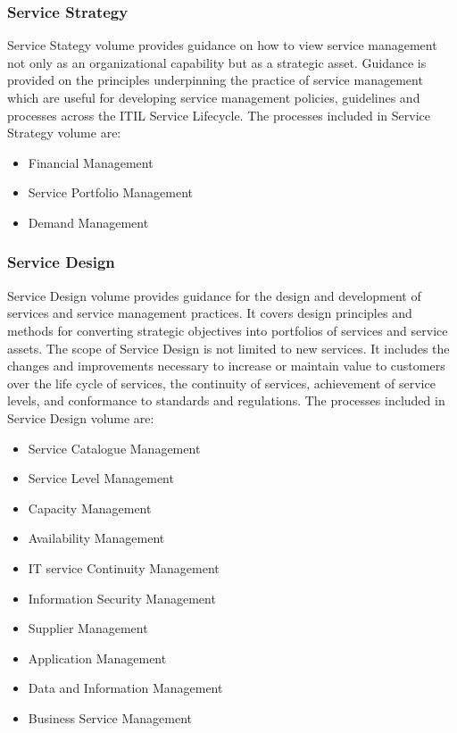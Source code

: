 \subsubsection{Service Strategy} 

Service Stategy volume provides guidance on how to view service management not only as an organizational capability but as a strategic asset. Guidance is provided on the principles underpinning the practice of service management which are useful for developing service management policies, guidelines and processes across the ITIL Service Lifecycle.\cite{itilSS} The processes included in Service Strategy volume are:

\begin{itemize}
  \item Financial Management
  \item Service Portfolio Management 
  \item Demand Management
\end{itemize}

\subsubsection{Service Design} 

Service Design volume provides guidance for the design and development of services and service management practices. It covers design principles and methods for converting strategic objectives into portfolios of services and service assets. The scope of Service Design is not limited to new services. It includes the changes and improvements necessary to increase or maintain value to customers over the life cycle of services, the continuity of services, achievement of service levels, and conformance to standards and regulations.\cite{itilSD} The processes included in Service Design volume are:

\begin{itemize}
  \item Service Catalogue Management
  \item Service Level Management 
  \item Capacity Management
  \item Availability Management
  \item IT service Continuity Management
  \item Information Security Management 
  \item Supplier Management
  \item Application Management
  \item Data and Information Management
  \item Business Service Management
\end{itemize} 

